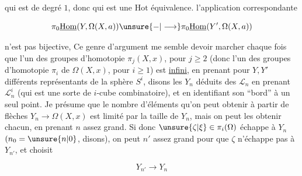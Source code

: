 
qui est de degré $1$, donc qui est une $\mathrm{Hot}$ équivalence.   l'application correspondante

\[
\pi_0\underline{\mathrm{Hom}}(Y,\Omega(X,a))\unsure{-|\longrightarrow}\pi_0\underline{\mathrm{Hom}}(Y',\Omega(X,a))
\]

n'est pas bijective, Ce genre d'argument me semble devoir marcher chaque fois que l'un des groupes d'homotopie  $\pi_j(X,x)$, pour $j\geq2$ (donc l'un des groupes d'homotopie $\pi_i$ de $\Omega(X,x)$, pour $i\geq1$) est \uline{infini}, en prenant pour $Y,Y'$  différents représentants  de la sphère $S^i$,  disons  les $Y_n$ déduits des  $\mathscr L_n$  en prenant $\mathscr L_n^i$  (qui est une sorte de $i$-cube combinatoire), et en identifiant son ``bord'' à un seul point. Je présume que le nombre d'éléments  qu'on peut obtenir à partir de  flèches $Y_n\longrightarrow\Omega(X,x)$ est limité par la taille de $Y_n$, mais on peut  les obtenir chacun, en prenant $n$ assez grand. Si donc $\unsure{\zeta|\xi}\in\pi_i(\Omega)$ échappe à $Y_n$ $(n_0=\unsure{n|0}$, disons), on peut  $n'$ assez grand pour que  $\zeta$ n'échappe pas à $Y_{n'}$, et  choisit

\[
Y_{n'}\longrightarrow Y_n
\]

